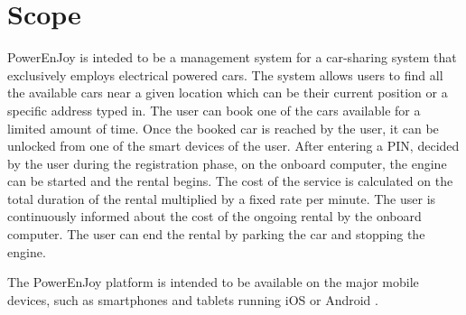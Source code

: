 \section{Scope}
PowerEnJoy is inteded to be a management system for a car-sharing system that exclusively employs electrical powered cars.
The system allows users to find all the available cars near a given location which can be their current position or a specific address typed in. The user can book one of the cars available for a limited amount of time.
Once the booked car is reached by the user, it can be unlocked from one of the smart devices of the user. After entering a PIN, decided by the user during the registration phase, on the onboard computer, the engine can be started and the rental begins.
The cost of the service is calculated on the total duration of the rental multiplied by a fixed rate per minute. The user is continuously informed about the cost of the ongoing rental by the onboard computer.
The user can end the rental by parking the car and stopping the engine.

The PowerEnJoy platform is intended to be available on the major mobile devices, such as smartphones and tablets running iOS \cite{ios} or Android \cite{android}.
